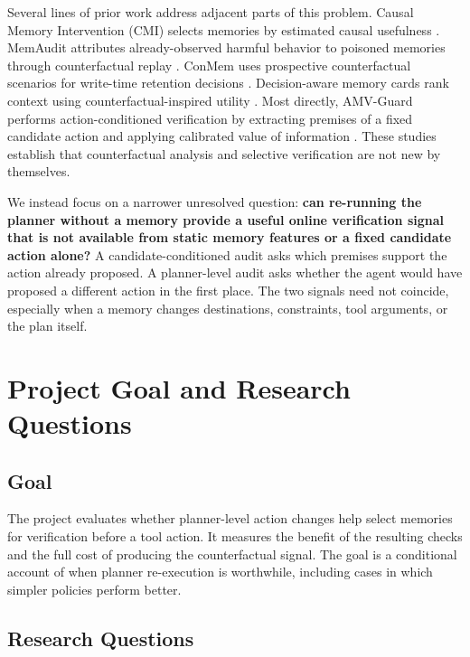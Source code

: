 \documentclass[11pt]{article}
\begin{document}
Several lines of prior work address adjacent parts of this problem. Causal Memory Intervention (CMI) selects memories by estimated causal usefulness \cite{srivastava2026cmi}. MemAudit attributes already-observed harmful behavior to poisoned memories through counterfactual replay \cite{tan2026memaudit}. ConMem uses prospective counterfactual scenarios for write-time retention decisions \cite{zhang2026conmem}. Decision-aware memory cards rank context using counterfactual-inspired utility \cite{guan2026cicl}. Most directly, AMV-Guard performs action-conditioned verification by extracting premises of a fixed candidate action and applying calibrated value of information \cite{wang2026amv}. These studies establish that counterfactual analysis and selective verification are not new by themselves.

We instead focus on a narrower unresolved question: \textbf{can re-running the planner without a memory provide a useful online verification signal that is not available from static memory features or a fixed candidate action alone?} A candidate-conditioned audit asks which premises support the action already proposed. A planner-level audit asks whether the agent would have proposed a different action in the first place. The two signals need not coincide, especially when a memory changes destinations, constraints, tool arguments, or the plan itself.

\section{Project Goal and Research Questions}

\subsection{Goal}

The project evaluates whether planner-level action changes help select memories for verification before a tool action. It measures the benefit of the resulting checks and the full cost of producing the counterfactual signal. The goal is a conditional account of when planner re-execution is worthwhile, including cases in which simpler policies perform better.

\subsection{Research Questions}
\end{document}
